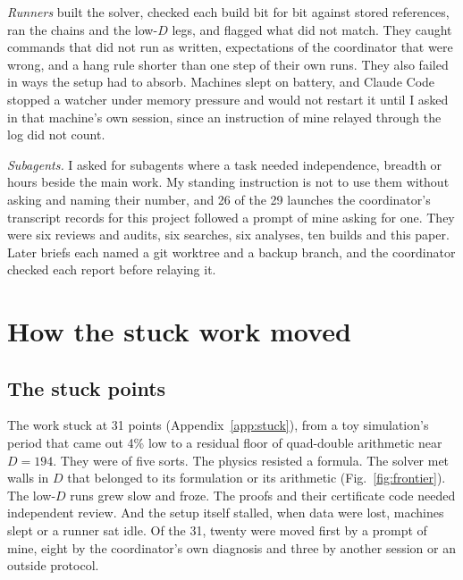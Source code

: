 \documentclass[aps,prd,onecolumn,superscriptaddress,nofootinbib,10pt]{revtex4-2}
\begin{document}
\emph{Runners} built the solver, checked each build bit for bit against stored references, ran the chains and the low-$D$
legs, and flagged what did not match. They caught commands that did not run as written, expectations of the coordinator
that were wrong, and a hang rule shorter than one step of their own runs. They also failed in ways the setup had to
absorb. Machines slept on battery, and Claude Code stopped a watcher under memory pressure and would not restart it until
I asked in that machine's own session, since an instruction of mine relayed through the log did not count.

\emph{Subagents.} I asked for subagents where a task needed independence, breadth or hours beside the main work. My
standing instruction is not to use them without asking and naming their number, and 26 of the 29 launches the
coordinator's transcript records for this project followed a prompt of mine asking for one. They were six reviews and
audits, six searches, six analyses, ten builds and this paper. Later briefs each named a git worktree and a backup
branch, and the coordinator checked each report before relaying it.

\section{How the stuck work moved}
\label{sec:moved}

\subsection{The stuck points}

The work stuck at 31 points (Appendix~\ref{app:stuck}), from a toy simulation's period that came out 4\% low to a
residual floor of quad-double arithmetic near $D = 194$. They were of five sorts. The physics resisted a formula. The
solver met walls in $D$ that belonged to its formulation or its arithmetic (Fig.~\ref{fig:frontier}). The low-$D$ runs
grew slow and froze. The proofs and their certificate code needed independent review. And the setup itself stalled, when
data were lost, machines slept or a runner sat idle. Of the 31, twenty were moved first by a prompt of mine, eight by the
coordinator's own diagnosis and three by another session or an outside protocol.
\end{document}

